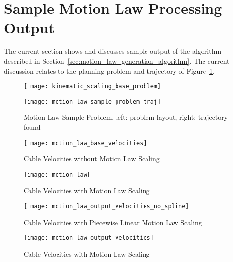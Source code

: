 \section{Sample Motion Law Processing Output}%
\label{sec:sample_motion_law_processing_output}

	The current section shows and discusses sample output of the algorithm
	described in Section~\ref{sec:motion_law_generation_algorithm}. The current
	discussion relates to the planning problem and trajectory of
	Figure~\ref{fig:motion_law_sample_problem}.

	\begin{figure}[hb]
		\begin{minipage}{0.5\textwidth}
			\centering
			\texttt{[image: kinematic\_scaling\_base\_problem]}
		\end{minipage}
		\begin{minipage}{0.5\textwidth}
			\centering
			\texttt{[image: motion\_law\_sample\_problem\_traj]}
		\end{minipage}
		\caption[Motion Law Sample Problem]{Motion Law Sample Problem,
		left: problem layout, right: trajectory found}
		\label{fig:motion_law_sample_problem}
	\end{figure}

	\begin{figure}[hbt!]
		\begin{minipage}{0.5\textwidth}
			\centering
			\texttt{[image: motion\_law\_base\_velocities]}
			\caption{Cable Velocities without Motion Law Scaling}
			\label{fig:cable_velocities_without_motion_law_scaling}
		\end{minipage}
		\begin{minipage}{0.5\textwidth}
			\centering
			\texttt{[image: motion\_law]}
			\caption{Cable Velocities with Motion Law Scaling}
			\label{fig:motion_law}
		\end{minipage}
	\end{figure}

	\begin{figure}[hbt!]
		\begin{minipage}{0.5\textwidth}
			\centering
			\texttt{[image: motion\_law\_output\_velocities\_no\_spline]}
			\caption{Cable Velocities with Piecewise Linear Motion Law Scaling}
			\label{fig:cable_velocities_with_motion_law_scaling_no_spline}
		\end{minipage}
		\begin{minipage}{0.5\textwidth}
			\centering
			\texttt{[image: motion\_law\_output\_velocities]}
			\caption{Cable Velocities with Motion Law Scaling}
			\label{fig:cable_velocities_with_motion_law_scaling}
		\end{minipage}
	\end{figure}

